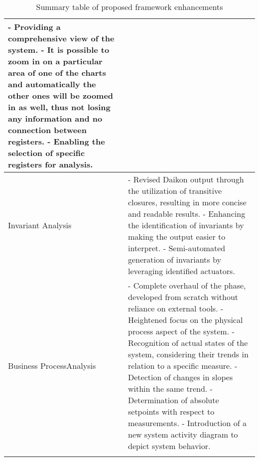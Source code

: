 {\begin{longtable}[c]{p{} p{}}
		- Providing a comprehensive view of the system.\newline 
		- It is possible to zoom in on a particular area of one of the charts and automatically the other ones will be zoomed in as well, thus not losing any information and no connection between registers.\newline
		- Enabling the selection of speciﬁc registers for analysis.\\
		\hline
		Invariant Analysis & - Revised Daikon output through the utilization of transitive closures, resulting in more concise and readable results.\newline
		- Enhancing the identification of invariants by making the output easier to interpret.\newline
		- Semi-automated generation of invariants by leveraging identiﬁed actuators.\\
		\hline
		Business Process\newline Analysis & - Complete overhaul of the phase, developed from scratch without reliance on external tools.\newline
		- Heightened focus on the physical process aspect of the system.\newline
		- Recognition of actual states of the system, considering their trends in relation to a specific measure.\newline
		- Detection of changes in slopes within the same trend.\newline
		- Determination of absolute setpoints with respect to measurements.\newline
		- Introduction of a new system activity diagram to depict system behavior. \\
		\hline
		
		\caption{Summary table of proposed framework enhancements}
		\label{table:4_proposed_framework_summarize}
	\end{longtable}
}

\vfill
\nolinenumbers